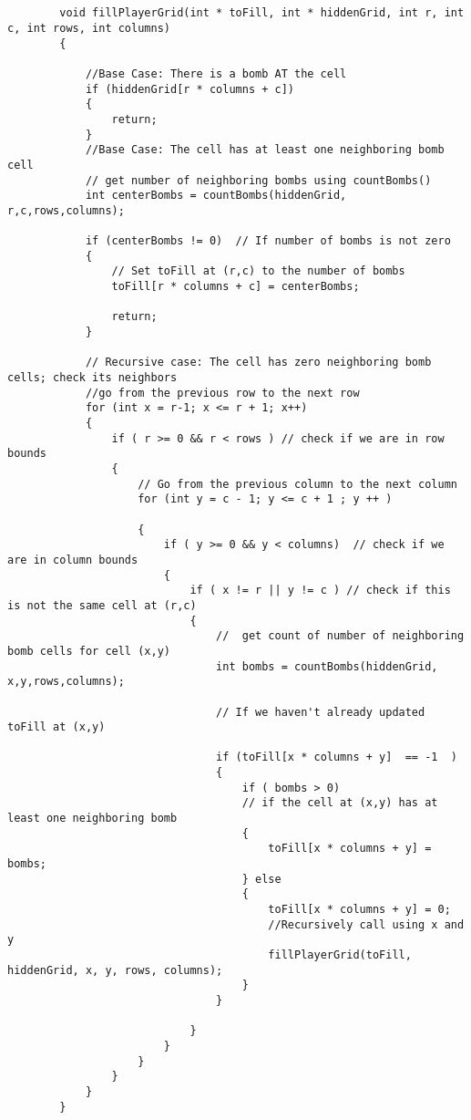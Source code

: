 \documentclass{article}
\begin{document}
\begin{enumerate}[label=(\alph*)]
\begin{lstlisting}[style=CStyle]
        
        
        void fillPlayerGrid(int * toFill, int * hiddenGrid, int r, int c, int rows, int columns) 
        {

            //Base Case: There is a bomb AT the cell
            if (hiddenGrid[r * columns + c])
            {
                return;
            }
            //Base Case: The cell has at least one neighboring bomb cell
            // get number of neighboring bombs using countBombs()
            int centerBombs = countBombs(hiddenGrid, r,c,rows,columns); 
            
            if (centerBombs != 0)  // If number of bombs is not zero
            {
                // Set toFill at (r,c) to the number of bombs
                toFill[r * columns + c] = centerBombs; 
                
                return;
            }

            // Recursive case: The cell has zero neighboring bomb cells; check its neighbors
            //go from the previous row to the next row 
            for (int x = r-1; x <= r + 1; x++) 
            {
                if ( r >= 0 && r < rows ) // check if we are in row bounds
                {
                    // Go from the previous column to the next column
                    for (int y = c - 1; y <= c + 1 ; y ++ ) 
                    
                    {
                        if ( y >= 0 && y < columns)  // check if we are in column bounds
                        {
                            if ( x != r || y != c ) // check if this is not the same cell at (r,c)
                            {   
                                //  get count of number of neighboring bomb cells for cell (x,y)
                                int bombs = countBombs(hiddenGrid, x,y,rows,columns); 
                                
                                // If we haven't already updated toFill at (x,y)
                                
                                if (toFill[x * columns + y]  == -1  )
                                {
                                    if ( bombs > 0) 
                                    // if the cell at (x,y) has at least one neighboring bomb
                                    {
                                        toFill[x * columns + y] = bombs;
                                    } else
                                    {
                                        toFill[x * columns + y] = 0;
                                        //Recursively call using x and y
                                        fillPlayerGrid(toFill, hiddenGrid, x, y, rows, columns);
                                    }
                                }
                                
                            }
                        }
                    }
                }
            }
        }
    \end{lstlisting}

    
\end{enumerate}
\end{document}
